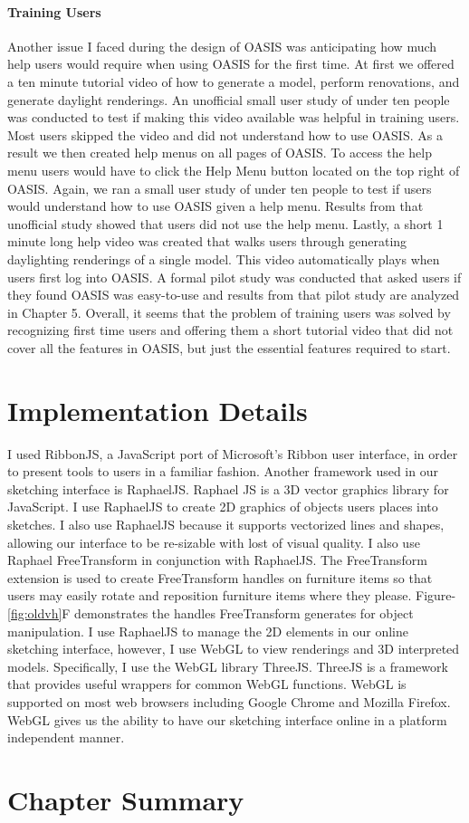 \paragraph{Training Users}
Another issue I faced during the design of OASIS was anticipating how much help users would require when using OASIS for the first time. At first we offered a ten minute tutorial video of how to generate a model, perform renovations, and generate daylight renderings. An unofficial small user study of under ten people was conducted to test if making this video available was helpful in training users. Most users skipped the video and did not understand how to use OASIS. As a result we then created help menus on all pages of OASIS. To access the help menu users would have to click the {Help Menu} button located on the top right of OASIS. Again, we ran a small user study of under ten people to test if users would understand how to use OASIS given a help menu.
Results from that unofficial study showed that users did not use the help menu.
Lastly, a short 1 minute long help video was created that walks users through generating daylighting renderings of a single model. This video automatically plays when users first log into OASIS.
A formal pilot study was conducted that asked users if they found OASIS was easy-to-use and results from that pilot study are analyzed in Chapter 5. Overall, it seems that the problem of training users was solved by recognizing first time users and offering them a short tutorial video that did not cover all the features in OASIS, but just the essential features required to start.

\section{Implementation Details}
I used RibbonJS, a JavaScript port of Microsoft's Ribbon user interface, in order to present tools to users in a familiar fashion\cite{todo}. 
Another framework used in our sketching interface is RaphaelJS\cite{todo}.
Raphael JS is a 3D vector graphics library for JavaScript. 
I use RaphaelJS to create 2D graphics of objects users places into sketches. I also use RaphaelJS because it supports vectorized lines and shapes, allowing our interface  to be re-sizable with lost of visual quality.
I also use Raphael FreeTransform in conjunction with RaphaelJS\cite{todo}. 
The FreeTransform extension is used to create FreeTransform handles on furniture items so that users may easily rotate and reposition furniture items where they please.
Figure-\ref{fig:oldvh}F demonstrates the handles FreeTransform generates for object manipulation.
I use RaphaelJS to manage the 2D elements in our online sketching interface, however, I use WebGL to view renderings and 3D interpreted models. 
Specifically, I use the WebGL library ThreeJS\cite{}.
ThreeJS is a framework that provides useful wrappers for common WebGL functions.
WebGL is supported on most web browsers including Google Chrome and Mozilla Firefox\cite{}.
WebGL gives us the ability to have our sketching interface online in a platform independent manner.










\section{Chapter Summary}

